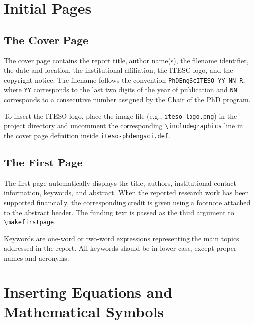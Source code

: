 \documentclass{iteso-irr}
\begin{document}

\section{Initial Pages}
\label{sec:initial}

\subsection{The Cover Page}
\label{sec:coverpage}

The cover page contains the report title, author name(s), the filename
identifier, the date and location, the institutional affiliation, the
ITESO logo, and the copyright notice. The filename follows the convention
\texttt{PhDEngScITESO-YY-NN-R}, where \texttt{YY} corresponds to the
last two digits of the year of publication and \texttt{NN} corresponds
to a consecutive number assigned by the Chair of the PhD program.

To insert the ITESO logo, place the image file (e.g.,
\texttt{iteso-logo.png}) in the  project directory and uncomment the
corresponding \verb|\includegraphics| line in the cover page definition
inside \texttt{iteso-phdengsci.def}.

\subsection{The First Page}
\label{sec:firstpage}

The first page automatically displays the title, authors, institutional
contact information, keywords, and abstract. When the reported research
work has been supported financially, the corresponding credit is given
using a footnote attached to the abstract header. The funding text is
passed as the third argument to \verb|\makefirstpage|.

Keywords are one-word or two-word expressions representing the main topics
addressed in the report. All keywords should be in lower-case, except
proper names and acronyms.


\section{Inserting Equations and Mathematical Symbols}
\label{sec:equations}
\end{document}
